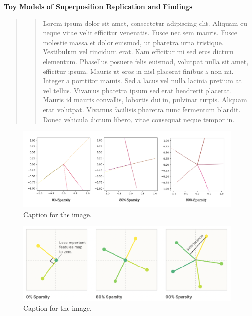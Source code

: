 \documentclass{article} %
\begin{document}


\noindent\makebox[\linewidth]{\rule{\textwidth}{1pt}} 
\vspace*{0mm} %
\begin{center}
    \Large\textbf{Toy Models of Superposition Replication and Findings}
\end{center}
\vspace*{2mm} %
\noindent\makebox[\linewidth]{\rule{\textwidth}{1pt}}
\newline

\begin{abstract}
\begin{quote}
    Lorem ipsum dolor sit amet, consectetur adipiscing elit. Aliquam eu neque 
    vitae velit efficitur venenatis. Fusce nec sem mauris. Fusce molestie massa 
    et dolor euismod, ut pharetra urna tristique. Vestibulum vel tincidunt erat. 
    Nam efficitur mi sed eros dictum elementum. Phasellus posuere felis euismod, 
    volutpat nulla sit amet, efficitur ipsum. Mauris ut eros in nisl placerat 
    finibus a non mi. Integer a porttitor mauris. Sed a lacus vel nulla lacinia 
    pretium at vel tellus. Vivamus pharetra ipsum sed erat hendrerit placerat. 
    Mauris id mauris convallis, lobortis dui in, pulvinar turpis. Aliquam erat 
    volutpat. Vivamus facilisis pharetra nunc fermentum blandit. Donec vehicula 
    dictum libero, vitae consequat neque tempor in.
\end{quote}
\end{abstract}

\begin{figure}[h]
    \centering
    \includegraphics[width=0.7\linewidth]{section_1/images/section1_replicated_graphic.png}
    \caption{Caption for the image.}
    \label{fig:my_label}
\end{figure}

\begin{figure}[h]
    \centering
    \includegraphics[width=0.67\linewidth]{section_1/images/section1_anthropic_graphic_.png}
    \caption{Caption for the image.}
    \label{fig:my_label}
\end{figure}


\end{document}
